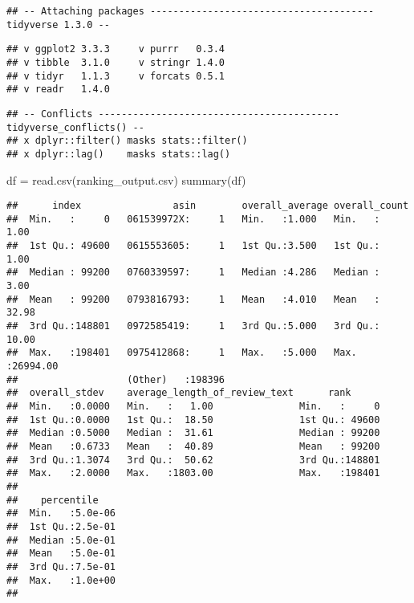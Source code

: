 \documentclass[
]{article}
\newenvironment{Shaded}{\begin{snugshade}}{\end{snugshade}}
\newcommand{\FunctionTok}[1]{\textcolor[rgb]{0.00,0.00,0.00}{#1}}
\newcommand{\NormalTok}[1]{#1}
\newcommand{\OtherTok}[1]{\textcolor[rgb]{0.56,0.35,0.01}{#1}}
\newcommand{\StringTok}[1]{\textcolor[rgb]{0.31,0.60,0.02}{#1}}
\begin{document}
\begin{verbatim}
## -- Attaching packages --------------------------------------- tidyverse 1.3.0 --
\end{verbatim}

\begin{verbatim}
## v ggplot2 3.3.3     v purrr   0.3.4
## v tibble  3.1.0     v stringr 1.4.0
## v tidyr   1.1.3     v forcats 0.5.1
## v readr   1.4.0
\end{verbatim}

\begin{verbatim}
## -- Conflicts ------------------------------------------ tidyverse_conflicts() --
## x dplyr::filter() masks stats::filter()
## x dplyr::lag()    masks stats::lag()
\end{verbatim}

\begin{Shaded}
\begin{Highlighting}[]
\NormalTok{df }\OtherTok{=} \FunctionTok{read.csv}\NormalTok{(}\StringTok{\textquotesingle{}ranking\_output.csv\textquotesingle{}}\NormalTok{)}
\FunctionTok{summary}\NormalTok{(df)}
\end{Highlighting}
\end{Shaded}

\begin{verbatim}
##      index                asin        overall_average overall_count     
##  Min.   :     0   061539972X:     1   Min.   :1.000   Min.   :    1.00  
##  1st Qu.: 49600   0615553605:     1   1st Qu.:3.500   1st Qu.:    1.00  
##  Median : 99200   0760339597:     1   Median :4.286   Median :    3.00  
##  Mean   : 99200   0793816793:     1   Mean   :4.010   Mean   :   32.98  
##  3rd Qu.:148801   0972585419:     1   3rd Qu.:5.000   3rd Qu.:   10.00  
##  Max.   :198401   0975412868:     1   Max.   :5.000   Max.   :26994.00  
##                   (Other)   :198396                                     
##  overall_stdev    average_length_of_review_text      rank       
##  Min.   :0.0000   Min.   :   1.00               Min.   :     0  
##  1st Qu.:0.0000   1st Qu.:  18.50               1st Qu.: 49600  
##  Median :0.5000   Median :  31.61               Median : 99200  
##  Mean   :0.6733   Mean   :  40.89               Mean   : 99200  
##  3rd Qu.:1.3074   3rd Qu.:  50.62               3rd Qu.:148801  
##  Max.   :2.0000   Max.   :1803.00               Max.   :198401  
##                                                                 
##    percentile     
##  Min.   :5.0e-06  
##  1st Qu.:2.5e-01  
##  Median :5.0e-01  
##  Mean   :5.0e-01  
##  3rd Qu.:7.5e-01  
##  Max.   :1.0e+00  
## 
\end{verbatim}
\end{document}
